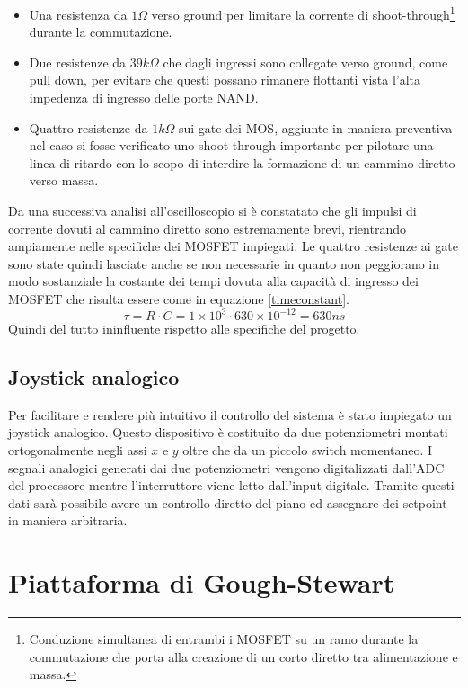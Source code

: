 \documentclass[12pt,twoside,openright]{report}
\begin{document}
\begin{itemize}
\item Una resistenza da $1\Omega$ verso ground per limitare la corrente di shoot-through\footnote{Conduzione simultanea di entrambi i MOSFET su un ramo durante la commutazione che porta alla creazione di un corto diretto tra alimentazione e massa.} durante la commutazione.
\item Due resistenze da $39k\Omega$ che dagli ingressi sono collegate verso ground, come pull down, per evitare che questi possano rimanere flottanti vista l'alta impedenza di ingresso delle porte NAND.
\item Quattro resistenze da $1k\Omega$ sui gate dei MOS, aggiunte in maniera preventiva nel caso si fosse verificato uno shoot-through importante per pilotare una linea di ritardo con lo scopo di interdire la formazione di un cammino diretto verso massa.
\end{itemize}
Da una successiva analisi all'oscilloscopio si è constatato che gli impulsi di corrente dovuti al cammino diretto sono estremamente brevi, rientrando ampiamente nelle specifiche dei MOSFET impiegati. Le quattro resistenze ai gate sono state quindi lasciate anche se non necessarie in quanto non peggiorano in modo sostanziale la costante dei tempi dovuta alla capacità di ingresso dei MOSFET che risulta essere come in equazione \ref{timeconstant}.
\begin{equation}\label{timeconstant}
\tau=R\cdot C = 1\times 10^3 \cdot 630\times 10^{-12}=630 ns
\end{equation}
Quindi del tutto ininfluente rispetto alle specifiche del progetto.

\section{Joystick analogico}\label{joystick}
Per facilitare e rendere più intuitivo il controllo del sistema è stato impiegato un joystick analogico. Questo dispositivo è costituito da due potenziometri montati ortogonalmente negli assi $x$ e $y$ oltre che da un piccolo switch momentaneo. I segnali analogici generati dai due potenziometri vengono digitalizzati dall'ADC del processore mentre l'interruttore viene letto dall'input digitale. Tramite questi dati sarà possibile avere un controllo diretto del piano ed assegnare dei setpoint in maniera arbitraria.

\newpage

\chapter{Piattaforma di Gough-Stewart}\label{pianostewart}
\end{document}

